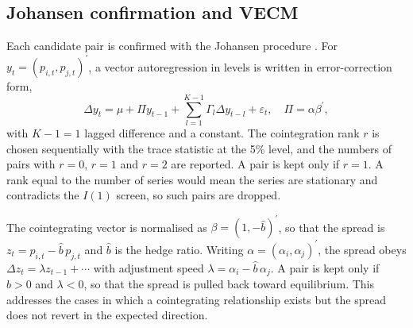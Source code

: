 \documentclass[10pt,a4paper,twocolumn]{article}
\begin{document}
	\subsection{Johansen confirmation and VECM}
	\label{sec:vecm}
	Each candidate pair is confirmed with the Johansen procedure \cite{johansen1988,johansen1991}. For $y_t=(p_{i,t},p_{j,t})^{\prime}$, a vector autoregression in levels is written in error-correction form,
	\begin{equation}
		\Delta y_t=\mu+\Pi y_{t-1}+\sum_{l=1}^{K-1}\Gamma_l\Delta y_{t-l}+\varepsilon_t,\quad \Pi=\alpha\beta^{\prime},
		\label{eq:vecm}
	\end{equation}
	with $K-1=1$ lagged difference and a constant. The cointegration rank $r$ is chosen sequentially with the trace statistic at the 5\% level, and the numbers of pairs with $r=0$, $r=1$ and $r=2$ are reported. A pair is kept only if $r=1$. A rank equal to the number of series would mean the series are stationary and contradicts the $I(1)$ screen, so such pairs are dropped.
	
	The cointegrating vector is normalised as $\beta=(1,-\hat b)^{\prime}$, so that the spread is $z_t=p_{i,t}-\hat b\,p_{j,t}$ and $\hat b$ is the hedge ratio. Writing $\alpha=(\alpha_i,\alpha_j)^{\prime}$, the spread obeys $\Delta z_t=\lambda z_{t-1}+\cdots$ with adjustment speed $\lambda=\alpha_i-\hat b\,\alpha_j$. A pair is kept only if $\hat b>0$ and $\lambda<0$, so that the spread is pulled back toward equilibrium. This addresses the cases in which a cointegrating relationship exists but the spread does not revert in the expected direction.
	
\end{document}
